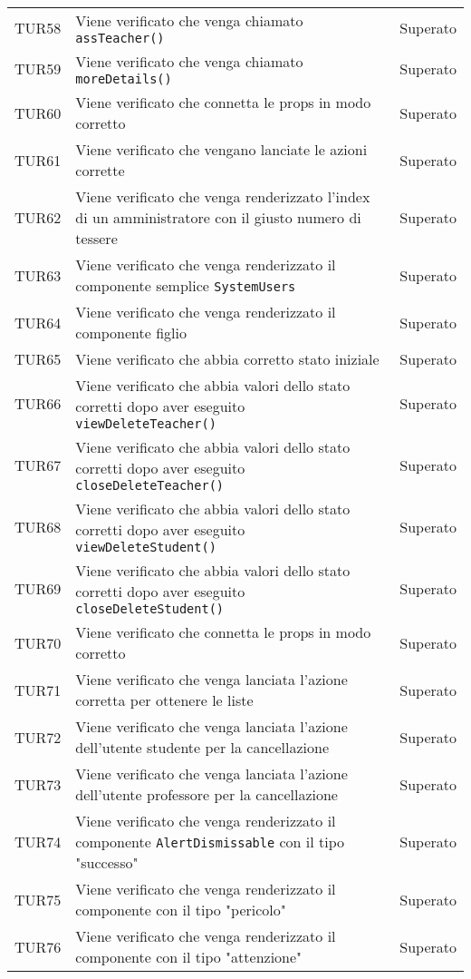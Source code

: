 \documentclass[PianoDiQualifica.tex]{subfiles}
\begin{document}
\begin{longtable}[H]{P{2cm}P{8.5cm}P{3cm}}
	TUR58 & Viene verificato che venga chiamato \texttt{assTeacher()} & Superato \\ 
	TUR59 & Viene verificato che venga chiamato \texttt{moreDetails()} & Superato \\ 
	TUR60 & Viene verificato che connetta le props in modo corretto & Superato \\ 
	TUR61 & Viene verificato che vengano lanciate le azioni corrette & Superato \\ 
	TUR62 & Viene verificato che venga renderizzato l'index di un amministratore con il giusto numero di tessere & Superato \\ 
	TUR63 & Viene verificato che venga renderizzato il componente semplice \texttt{SystemUsers} & Superato \\ 
	TUR64 & Viene verificato che venga renderizzato il componente figlio & Superato \\ 
	TUR65 & Viene verificato che abbia corretto stato iniziale & Superato \\ 
	TUR66 & Viene verificato che abbia valori dello stato corretti dopo aver eseguito \texttt{viewDeleteTeacher()} & Superato \\ 
	TUR67 & Viene verificato che abbia valori dello stato corretti dopo aver eseguito \texttt{closeDeleteTeacher()} & Superato \\ 
	TUR68 & Viene verificato che abbia valori dello stato corretti dopo aver eseguito \texttt{viewDeleteStudent()} & Superato \\ 
	TUR69 & Viene verificato che abbia valori dello stato corretti dopo aver eseguito \texttt{closeDeleteStudent()} & Superato \\ 
	TUR70 & Viene verificato che connetta le props in modo corretto & Superato \\ 
	TUR71 & Viene verificato che venga lanciata l'azione corretta per ottenere le liste & Superato \\ 
	TUR72 & Viene verificato che venga lanciata l'azione dell'utente studente per la cancellazione & Superato \\ 
	TUR73 & Viene verificato che venga lanciata l'azione dell'utente professore per la cancellazione & Superato \\ 
	TUR74 & Viene verificato che venga renderizzato il componente \texttt{AlertDismissable} con il tipo "successo" & Superato \\ 
	TUR75 & Viene verificato che venga renderizzato il componente con il tipo "pericolo" & Superato \\ 
	TUR76 & Viene verificato che venga renderizzato il componente con il tipo "attenzione"  & Superato \\ 

\end{longtable}
\end{document}
